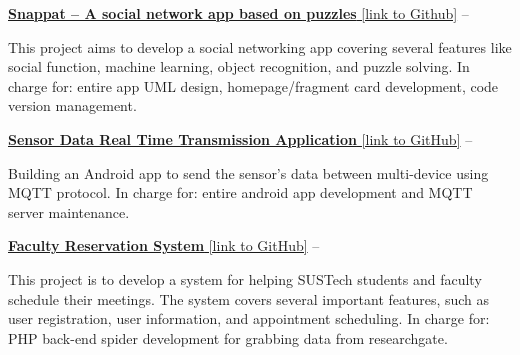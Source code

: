 \documentclass[a4paper,MMMyyyy,nonstopmode]{simpleresumecv}
\begin{document}
\begin{Body}
    \Gap

    \BulletItem
    \href{https://github.com/hackroid/snappat}{\textbf{Snappat -- A social network app based on puzzles} [link to Github]}
    \hfill
     --
    \begin{Detail}
        \SubBulletItem
        This project aims to develop a social networking app covering several features like social function, machine learning, object recognition, and puzzle solving.
        \SubBulletItem
        In charge for: entire app UML design, homepage/fragment card development, code version management.
    \end{Detail}

    \Gap

    \BulletItem
    \href{https://github.com/hackroid/MqttSensorDemo}{\textbf{Sensor Data Real Time Transmission Application} [link to GitHub]}
    \hfill
     --
    \begin{Detail}
        \SubBulletItem
        Building an Android app to send the sensor's data between multi-device using MQTT protocol.
        \SubBulletItem
        In charge for: entire android app development and MQTT server maintenance.
    \end{Detail}

    \Gap

    \BulletItem
    \href{https://github.com/zhaoweizhong/Faculty-Reservation}{\textbf{Faculty Reservation System} [link to GitHub]}
    \hfill
     --
    \begin{Detail}
        \SubBulletItem
        This project is to develop a system for helping SUSTech students and faculty schedule their meetings. The system covers several important features, such as user registration, user information, and appointment scheduling.
        \SubBulletItem
        In charge for: PHP back-end spider development for grabbing data from researchgate.
    \end{Detail}




\end{Body}
\end{document}
